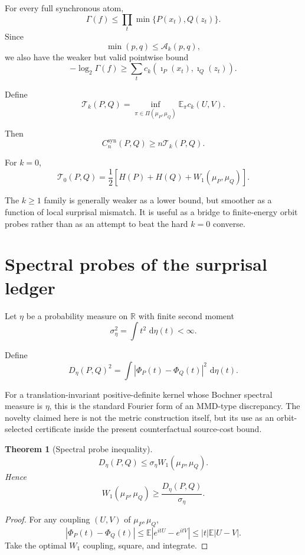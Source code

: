 \documentclass[11pt,a4paper]{article}
\newtheorem{theorem}{Theorem}[section]
\newcommand{\Csyn}{C^{\mathrm{syn}}}
\newcommand{\E}{\mathbb E}
\newcommand{\R}{\mathbb R}
\newcommand{\1}{\mathbf 1}
\newcommand{\dd}{\,\mathrm d}
\begin{document}
For every full synchronous atom,
\[
\Gamma(f)
\le
\prod_t\min\{P(x_t),Q(z_t)\}.
\]
Since
\[
\min(p,q)\le\mathcal A_k(p,q),
\]
we also have the weaker but valid pointwise bound
\[
-\log_2\Gamma(f)
\ge
\sum_t c_k(
\imath_P(x_t),
\imath_Q(z_t)
).
\]

Define
\[
\boxed{
\mathcal T_k(P,Q)
=
\inf_{\pi\in\Pi(\mu_P,\mu_Q)}
\E_\pi c_k(U,V).
}
\tag{35.1}
\]

Then
\[
\boxed{
\Csyn_n(P,Q)
\ge
n\mathcal T_k(P,Q).
}
\tag{35.2}
\]

For \(k=0\),
\[
\mathcal T_0(P,Q)
=
\frac12
\left[
H(P)+H(Q)+W_1(\mu_P,\mu_Q)
\right].
\tag{35.3}
\]

The \(k\ge1\) family is generally weaker as a lower bound, but smoother
as a function of local surprisal mismatch.
It is useful as a bridge to finite-energy orbit probes rather than as an
attempt to beat the hard \(k=0\) converse.


\section{Spectral probes of the surprisal ledger}

Let \(\eta\) be a probability measure on \(\R\) with finite second
moment
\[
\sigma_\eta^2
=
\int t^2\,\dd\eta(t)
<\infty.
\tag{36.1}
\]

Define
\[
\boxed{
D_\eta(P,Q)^2
=
\int
|\Phi_P(t)-\Phi_Q(t)|^2
\,\dd\eta(t).
}
\tag{36.2}
\]

For a translation-invariant positive-definite kernel whose Bochner
spectral measure is \(\eta\), this is the standard Fourier form of an
MMD-type discrepancy.
The novelty claimed here is not the metric construction itself, but its
use as an orbit-selected certificate inside the present counterfactual
source-cost bound.

\begin{theorem}[Spectral probe inequality]
\[
\boxed{
D_\eta(P,Q)
\le
\sigma_\eta
W_1(\mu_P,\mu_Q).
}
\tag{36.3}
\]
Hence
\[
\boxed{
W_1(\mu_P,\mu_Q)
\ge
\frac{D_\eta(P,Q)}{\sigma_\eta}.
}
\tag{36.4}
\]
\end{theorem}

\begin{proof}
For any coupling \((U,V)\) of \(\mu_P,\mu_Q\),
\[
|\Phi_P(t)-\Phi_Q(t)|
\le
\E|e^{itU}-e^{itV}|
\le
|t|\E|U-V|.
\]
Take the optimal \(W_1\) coupling, square, and integrate.
\end{proof}
\end{document}
